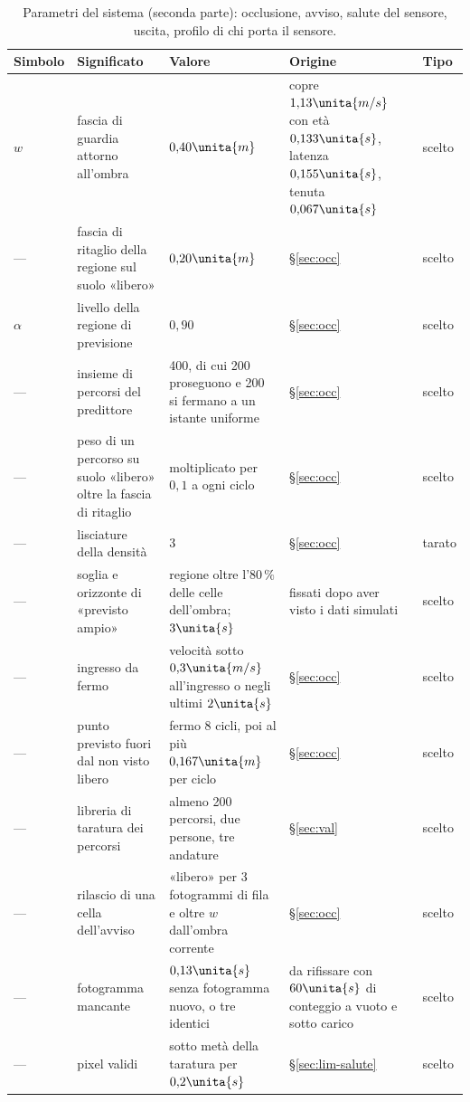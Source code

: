 \begin{table}[H]\centering\footnotesize
\caption{Parametri del sistema (seconda parte): occlusione, avviso, salute del sensore, uscita, profilo di chi porta il sensore.}\label{tab:par-parametri-due}
\begin{tabularx}{\linewidth}{@{}p{1.25cm}Lp{3.5cm}Lp{1.2cm}@{}}
\toprule
Simbolo & Significato & Valore & Origine & Tipo\\
\midrule
$w$ & fascia di guardia attorno all'ombra & $0{,}40\unita{m}$ & copre $1{,}13\unita{m/s}$ con età $0{,}133\unita{s}$, latenza $0{,}155\unita{s}$, tenuta $0{,}067\unita{s}$ & scelto\\
--- & fascia di ritaglio della regione sul suolo «libero» & $0{,}20\unita{m}$ & \S\ref{sec:occ} & scelto\\
$\alpha$ & livello della regione di previsione & $0{,}90$ & \S\ref{sec:occ} & scelto\\
--- & insieme di percorsi del predittore & 400, di cui 200 proseguono e 200 si fermano a un istante uniforme & \S\ref{sec:occ} & scelto\\
--- & peso di un percorso su suolo «libero» oltre la fascia di ritaglio & moltiplicato per $0{,}1$ a ogni ciclo & \S\ref{sec:occ} & scelto\\
--- & lisciature della densità & 3 & \S\ref{sec:occ} & tarato\\
--- & soglia e orizzonte di «previsto ampio» & regione oltre l'$80\,\%$ delle celle dell'ombra; $3\unita{s}$ & fissati dopo aver visto i dati simulati & scelto\\
--- & ingresso da fermo & velocità sotto $0{,}3\unita{m/s}$ all'ingresso o negli ultimi $2\unita{s}$ & \S\ref{sec:occ} & scelto\\
--- & punto previsto fuori dal non visto libero & fermo 8 cicli, poi al più $0{,}167\unita{m}$ per ciclo & \S\ref{sec:occ} & scelto\\
--- & libreria di taratura dei percorsi & almeno 200 percorsi, due persone, tre andature & \S\ref{sec:val} & scelto\\
--- & rilascio di una cella dell'avviso & «libero» per 3 fotogrammi di fila e oltre $w$ dall'ombra corrente & \S\ref{sec:occ} & scelto\\
--- & fotogramma mancante & $0{,}13\unita{s}$ senza fotogramma nuovo, o tre identici & da rifissare con $60\unita{s}$ di conteggio a vuoto e sotto carico & scelto\\
--- & pixel validi & sotto metà della taratura per $0{,}2\unita{s}$ & \S\ref{sec:lim-salute} & scelto\\

\end{tabularx}
\end{table}
